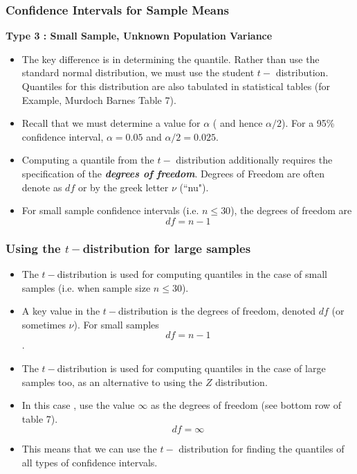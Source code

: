 \documentclass[a4]{beamer}
\begin{document}
\begin{frame}
\frametitle{Confidence Intervals for Sample Means}
\textbf{Type 3 : Small Sample, Unknown Population Variance}\\
\begin{itemize}
\item The key difference is in determining the quantile. Rather than use the standard normal distribution, we must use the student $t-$ distribution. Quantiles for this distribution are also tabulated in statistical tables (for Example, Murdoch Barnes Table 7).
\item Recall that we must determine a value for $\alpha$ ( and hence $\alpha/2$). For a 95\% confidence interval, $\alpha= 0.05$  and $\alpha/2 = 0.025$.
\item Computing a quantile from the $t-$ distribution additionally requires the specification of the \textit{\textbf{degrees of freedom}}. Degrees of Freedom are often denote as $df$ or by the greek letter $\nu$ (``nu").
\item For small sample confidence intervals (i.e. $n \leq 30$), the degrees of freedom are
\[ df = n-1 \]
\end{itemize}
\end{frame}




\begin{frame}
\frametitle{Using the $t-$distribution for large samples}

\begin{itemize}
\item The $t-$distribution is used for computing quantiles in the case of small samples (i.e. when sample size $n \leq 30$).
\item A key value in the $t-$distribution is the degrees of freedom, denoted $df$ (or sometimes $\nu$). For small samples \[ df= n-1\].
\item The $t-$distribution is used for computing quantiles in the case of large samples too, as an alternative to using the $Z$ distribution.
\item In this case , use the value $\infty$ as the degrees of freedom (see bottom row of table 7).
\[ df= \infty\]
\item This means that we can use the $t-$ distribution for finding the quantiles of all types of confidence intervals.

\end{itemize}
\end{frame}
\end{document}
